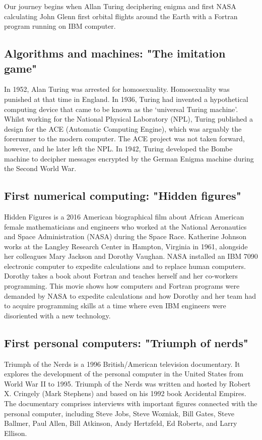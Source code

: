 Our journey begins when Allan Turing deciphering enigma and first NASA calculating 
John Glenn first orbital flights around the Earth with a Fortran program running on IBM computer. 
  
  

  \newpage 
\subsection*{Algorithms and machines: "The imitation game"} 
 In 1952, Alan Turing was arrested for homosexuality. 
 Homosexuality was punished at that time in England. 
 In 1936, Turing had invented a hypothetical computing device that came to be known 
 as the ‘universal Turing machine’. 
 Whilst working for the National Physical Laboratory (NPL), 
 Turing published a design for the ACE (Automatic Computing Engine), which was 
 arguably the forerunner to the modern computer. 
 The ACE project was not taken forward, however, and he later left the NPL. 
 In 1942,  Turing developed the Bombe machine to decipher messages encrypted by the German Enigma 
 machine during the Second World War. 
 
   
   

\subsection*{First numerical computing: "Hidden figures"}
 Hidden Figures is a 2016 American biographical  film 
 about African American female mathematicians and engineers 
 who worked at the National Aeronautics and Space Administration (NASA) 
 during the Space Race.
 Katherine Johnson works at the Langley Research Center in Hampton, Virginia in 1961, 
 alongside her colleagues Mary Jackson and Dorothy Vaughan. 
 NASA installed an IBM 7090 electronic computer to expedite calculations and to replace human computers. 
 Dorothy takes a book about Fortran and teaches herself and her co-workers programming. 
 This movie shows how computers and Fortran programs were demanded by NASA
 to expedite calculations and how Dorothy and her team had to acquire programming skills 
 at a time where even IBM engineers were disoriented with a new technology. 
 
  
   
  

\subsection*{First personal computers: "Triumph of nerds"}
 Triumph of the Nerds is a 1996 British/American television documentary.
 It explores the development of the personal computer in the United States from World War II to 1995. 
 Triumph of the Nerds was written and hosted by Robert X. Cringely (Mark Stephens) 
 and based on his 1992 book Accidental Empires. 
 The documentary comprises interviews with important figures connected with the personal computer, 
 including Steve Jobs, Steve Wozniak, Bill Gates, Steve Ballmer, Paul Allen, Bill Atkinson, 
 Andy Hertzfeld, Ed Roberts, and Larry Ellison. 
 
